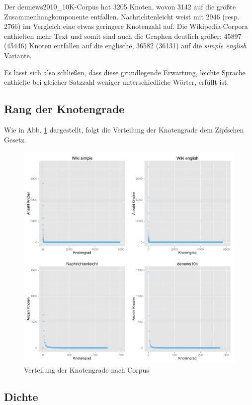 \documentclass[11pt, a4paper]{article}
\begin{document}
Der deunews2010\_10K-Corpus hat 3205 Knoten, wovon 3142 auf die größte
Zusammenhangkomponente entfallen.
Nachrichtenleicht weist mit 2946 (resp. 2766) im Vergleich eine etwas geringere
Knotenzahl auf.
Die Wikipedia-Corpora enthielten mehr Text und somit sind auch die Graphen
deutlich größer: 45897 (45446) Knoten entfallen auf die englische, 36582 (36131)
auf die \emph{simple english} Variante.

Es l\"asst sich also schlie\ss{}en, dass diese grundlegende Erwartung,
leichte Sprache enthielte bei gleicher Satzzahl weniger unterschiedliche Wörter,
erf\"ullt ist.


\subsection{Rang der Knotengrade}

Wie in Abb. \ref{fig-vdeg} dargestellt, folgt die Verteilung der Knotengrade
dem Zipfschen Gesetz.

\begin{figure}[ht]
    \centering
        \includegraphics[scale=.5]{vdeg_plots.pdf}
    \caption{Verteilung der Knotengrade nach Corpus}
    \label{fig-vdeg}
\end{figure}


\subsection{Dichte}
\end{document}
